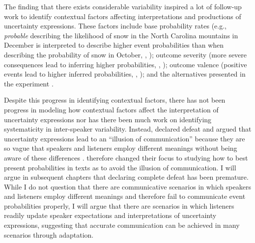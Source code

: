 The finding that there exists considerable variability inspired a lot of follow-up work to identify contextual factors
affecting interpretations and productions of uncertainty expressions. These factors include base probability rates (e.g.,
\textit{probable} describing the likelihood of snow in the North Carolina mountains in December is interpreted to describe
higher event probabilities than when describing the probability of snow in October, \citeauthor{Wallsten1986b}, \citeyear{Wallsten1986b}); 
outcome severity (more severe consequences lead to inferring higher probabilities, \citeauthor{Weber1990}, \citeyear{Weber1990}); outcome valence
(positive events lead to higher inferred probabilities, \citeauthor{Mullet1991}, \citeyear{Mullet1991}); and the alternatives presented in the experiment 
\cite{Fillenbaum1991}.

Despite this progress in identifying contextual factors, there has not been progress in modeling how contextual factors
affect the interpretation of uncertainty expressions nor has there been much work on identifying systematicity in
inter-speaker variability. Instead, \textcite{Budescu2009} declared defeat and argued that uncertainty expressions
lead to an ``illusion of communication'' because they are so vague that speakers and listeners employ different meanings
without being aware of these differences \parencite[see also][]{Amer1994,Brun1988,Teigen1999}.
 \textcite{Budescu2009} therefore changed their focus to studying how to best present probabilities in texts as to avoid the illusion 
 of communication. I will argue in subsequent chapters that declaring complete defeat has been premature. While I do not question
 that there are communicative scenarios in which speakers and listeners employ different meanings and therefore
 fail to communicate event probabilities properly, I will argue that there are scenarios in which listeners readily update speaker
 expectations and interpretations of uncertainty expressions, suggesting that accurate communication can be achieved in many
 scenarios through adaptation.
  

